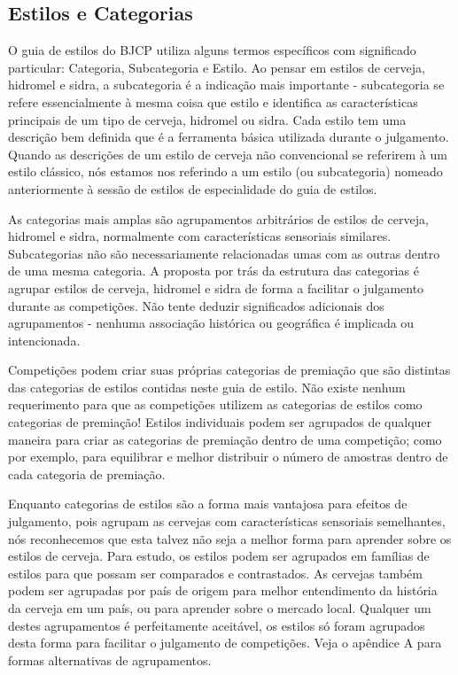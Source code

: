 \subsection*{Estilos e Categorias}

O guia de estilos do BJCP utiliza alguns termos específicos com significado particular: Categoria, Subcategoria e Estilo. Ao pensar em estilos de cerveja, hidromel e sidra, a subcategoria é a indicação mais importante - subcategoria se refere essencialmente à mesma coisa que estilo e identifica as características principais de um tipo de cerveja, hidromel ou sidra. Cada estilo tem uma descrição bem definida que é a ferramenta básica utilizada durante o julgamento. \\

Quando as descrições de um estilo de cerveja não convencional se referirem à um estilo clássico, nós estamos nos referindo a um estilo (ou subcategoria) nomeado anteriormente à sessão de estilos de especialidade do guia de estilos.

As categorias mais amplas são agrupamentos arbitrários de estilos de cerveja, hidromel e sidra, normalmente com características sensoriais similares. Subcategorias não são necessariamente relacionadas umas com as outras dentro de uma mesma categoria. A proposta por trás da estrutura das categorias é agrupar estilos de cerveja, hidromel e sidra de forma a facilitar o julgamento durante as competições. Não tente deduzir significados adicionais dos agrupamentos - nenhuma associação histórica ou geográfica é implicada ou intencionada.

Competições podem criar suas próprias categorias de premiação que são distintas das categorias de estilos contidas neste guia de estilo. Não existe nenhum requerimento para que as competições utilizem as categorias de estilos como categorias de premiação! Estilos individuais podem ser agrupados de qualquer maneira para criar as categorias de premiação dentro de uma competição; como por exemplo, para equilibrar e melhor distribuir o número de amostras dentro de cada categoria de premiação.

Enquanto categorias de estilos são a forma mais vantajosa para efeitos de julgamento, pois agrupam as cervejas com características sensoriais semelhantes, nós reconhecemos que esta talvez não seja a melhor forma para aprender sobre os estilos de cerveja. Para estudo, os estilos podem ser agrupados em famílias de estilos para que possam ser comparados e contrastados. As cervejas também podem ser agrupadas por país de origem para melhor entendimento da história da cerveja em um país, ou para aprender sobre o mercado local. Qualquer um destes agrupamentos é perfeitamente aceitável, os estilos só foram agrupados desta forma para facilitar o julgamento de competições. Veja o apêndice A para formas alternativas de agrupamentos.